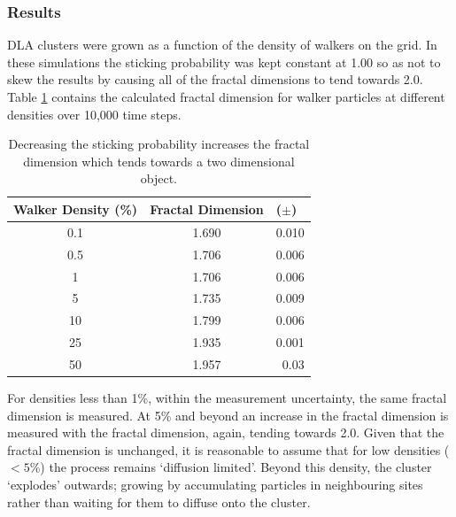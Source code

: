 \documentclass[%
 aapm,
 mph,%
 amsmath,amssymb,
 reprint,%
]{revtex4-2}
\begin{document}
\subsubsection{\label{sec:density_results}Results}
DLA clusters were grown as a function of the density of walkers on the grid. In these simulations the sticking probability was kept constant at 1.00 so as not to skew the results by causing all of the fractal dimensions to tend towards 2.0. Table \ref{tab:density_dependence} contains the calculated fractal dimension for walker particles at different densities over 10,000 time steps.
\begin{table}[h]
\caption{\label{tab:density_dependence}Decreasing the sticking probability increases the fractal dimension which tends towards a two dimensional object.}
\begin{ruledtabular}
\begin{tabular}{ccr}
\multicolumn{1}{l}{Walker Density (\%)} & \multicolumn{1}{l}{Fractal Dimension} & \multicolumn{1}{l}{($\pm$)} \\ \hline
\multicolumn{1}{c|}{0.1}                & 1.690                                 & 0.010                       \\
\multicolumn{1}{c|}{0.5}                & 1.706                                 & 0.006                       \\
\multicolumn{1}{c|}{1}                  & 1.706                                 & 0.006                       \\
\multicolumn{1}{c|}{5}                  & 1.735                                 & 0.009                       \\
\multicolumn{1}{c|}{10}                 & 1.799                                 & 0.006                       \\
\multicolumn{1}{c|}{25}                 & 1.935                                 & 0.001                       \\
\multicolumn{1}{c|}{50}                 & 1.957                                 & 0.03                       
\end{tabular}
\end{ruledtabular}
\end{table}
For densities less than 1\%, within the measurement uncertainty, the same fractal dimension is measured. At 5\% and beyond an increase in the fractal dimension is measured with the fractal dimension, again, tending towards 2.0. Given that the fractal dimension is unchanged, it is reasonable to assume that for low densities ($<5\%$) the process remains `diffusion limited'. Beyond this density, the cluster `explodes' outwards; growing by accumulating particles in neighbouring sites rather than waiting for them to diffuse onto the cluster.
\end{document}

